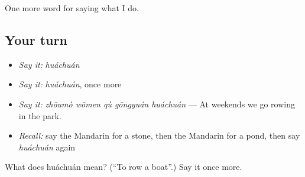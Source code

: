 \begin{grammarlens}[title={What you've built}]
One more word for saying what I do.
\end{grammarlens}

\subsection*{Your turn}
\begin{itemize}
\raggedright
  \item \emph{Say it:} \emph{huáchuán}
  \item \emph{Say it:} \emph{huáchuán}, once more
  \item \emph{Say it:} \emph{zhōumò wǒmen qù gōngyuán huáchuán} — At weekends we go rowing in the park.
  \item \emph{Recall:} say the Mandarin for a stone, then the Mandarin for a pond, then say \emph{huáchuán} again
\end{itemize}

\begin{tcolorbox}[breakable,colback=teal!4,colframe=teal!35!black,title={Before you move on}]
What does huáchuán mean? (\textquotedblleft{}To row a boat\textquotedblright{}.) Say it once more.
\end{tcolorbox}
